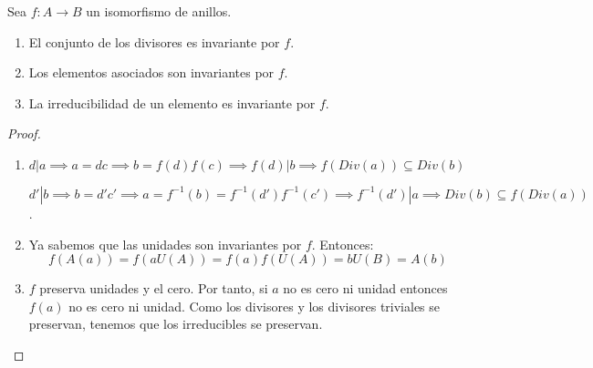 \begin{proposition}
Sea $f:A \to B$ un isomorfismo de anillos. 

\begin{enumerate}
\item El conjunto de los divisores es invariante por $f$. 
\item Los elementos asociados son invariantes por $f$. 
\item La irreducibilidad de un elemento es invariante por $f$. 
\end{enumerate}
\end{proposition}
\begin{proof}
\begin{enumerate}
\item $d|a \implies a = dc \implies b = f(d)f(c) \implies f(d)|b \implies f(Div(a)) \subseteq Div(b)$

$d'|b \implies b = d'c' \implies a = f^{-1}(b) = f^{-1}(d')f^{-1}(c') \implies f^{-1}(d') | a \implies Div(b) \subseteq f(Div(a))$. 

\item Ya sabemos que las unidades son invariantes por $f$. Entonces: $$f(A(a)) = f(aU(A)) = f(a)f(U(A)) = bU(B) = A(b)$$

\item $f$ preserva unidades y el cero. Por tanto, si $a$ no es cero ni unidad entonces $f(a)$ no es cero ni unidad. Como los divisores y los divisores triviales se preservan, tenemos que los irreducibles se preservan. 
\end{enumerate}
\end{proof}























